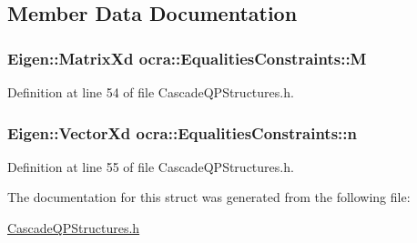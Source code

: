 \subsection{Member Data Documentation}
\subsubsection[{\texorpdfstring{M}{M}}]{\setlength{\rightskip}{0pt plus 5cm}Eigen\+::\+Matrix\+Xd ocra\+::\+Equalities\+Constraints\+::M}\hypertarget{structocra_1_1EqualitiesConstraints_a948420ad39defa889f402d30041a3521}{}\label{structocra_1_1EqualitiesConstraints_a948420ad39defa889f402d30041a3521}


Definition at line 54 of file Cascade\+Q\+P\+Structures.\+h.

\subsubsection[{\texorpdfstring{n}{n}}]{\setlength{\rightskip}{0pt plus 5cm}Eigen\+::\+Vector\+Xd ocra\+::\+Equalities\+Constraints\+::n}\hypertarget{structocra_1_1EqualitiesConstraints_a03425f2d5d16dbb6a0c7da036a2fee77}{}\label{structocra_1_1EqualitiesConstraints_a03425f2d5d16dbb6a0c7da036a2fee77}


Definition at line 55 of file Cascade\+Q\+P\+Structures.\+h.



The documentation for this struct was generated from the following file\+:\begin{DoxyCompactItemize}
\item 
\hyperlink{CascadeQPStructures_8h}{Cascade\+Q\+P\+Structures.\+h}\end{DoxyCompactItemize}
